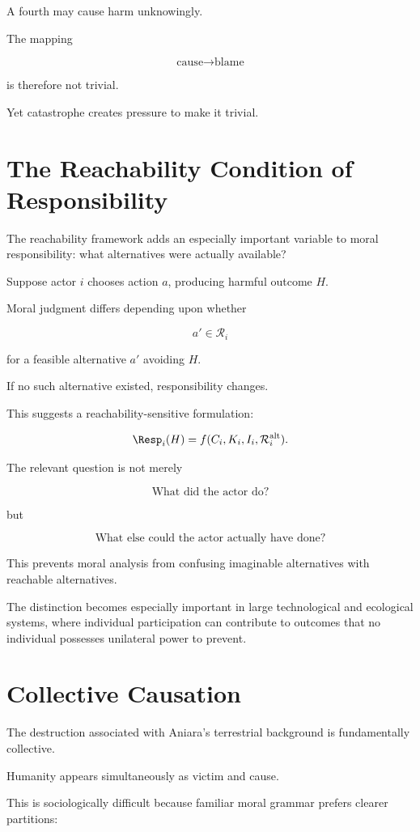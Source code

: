 \documentclass[11pt,oneside]{book}
\theoremstyle{definition}
\theoremstyle{remark}
\newcommand{\R}{\mathcal{R}}
\begin{document}
A fourth may cause harm unknowingly.

The mapping

\[
\text{cause}\rightarrow\text{blame}
\]

is therefore not trivial.

Yet catastrophe creates pressure to make it trivial.

\section{The Reachability Condition of Responsibility}

The reachability framework adds an especially important variable to moral responsibility: what alternatives were actually available?

Suppose actor \(i\) chooses action \(a\), producing harmful outcome \(H\).

Moral judgment differs depending upon whether

\[
a'\in\R_i
\]

for a feasible alternative \(a'\) avoiding \(H\).

If no such alternative existed, responsibility changes.

This suggests a reachability-sensitive formulation:

\[
\Resp_i(H)
=
f(
C_i,
K_i,
I_i,
\R_i^{\mathrm{alt}}
).
\]

The relevant question is not merely

\[
\text{What did the actor do?}
\]

but

\[
\text{What else could the actor actually have done?}
\]

This prevents moral analysis from confusing imaginable alternatives with reachable alternatives.

The distinction becomes especially important in large technological and ecological systems, where individual participation can contribute to outcomes that no individual possesses unilateral power to prevent.

\section{Collective Causation}

The destruction associated with Aniara's terrestrial background is fundamentally collective.

Humanity appears simultaneously as victim and cause.

This is sociologically difficult because familiar moral grammar prefers clearer partitions:
\end{document}
